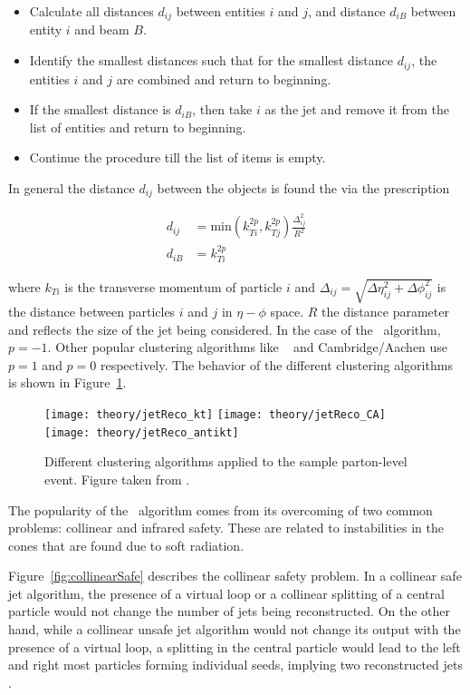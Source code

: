 \begin{itemize}
\item Calculate all distances $d_{ij}$ between entities $i$ and $j$, and distance $d_{iB}$ between entity $i$ and beam $B$.
\item Identify the smallest distances such that for the smallest distance $d_{ij}$, the entities $i$ and $j$ are combined and return to beginning.
\item If the smallest distance is $d_{iB}$, then take $i$ as the jet and remove it from the list of entities and return to beginning.
\item Continue the procedure till the list of items is empty.
\end{itemize}

In general the distance $d_{ij}$ between the objects is found the via the prescription

\begin{align}
d_{ij} &= \mathrm{min} (k_{Ti}^{2p} , k_{Tj}^{2p}) \frac{\Delta_{ij}^2}{R^2}  \\
d_{iB} &= k_{Ti}^{2p}
\end{align}

where $k_{Ti}$ is the transverse momentum of particle $i$ and $\Delta_{ij} = \sqrt{\Delta\eta_{ij}^2 + \Delta\phi_{ij}^2}$ is the distance between particles $i$ and $j$ in $\eta-\phi$ space.
$R$ the distance parameter and reflects the size of the jet being considered.
In the case of the \antikt\ algorithm, $p = -1$.
Other popular clustering algorithms like \kt\ \cite{Catani:1993hr} and Cambridge/Aachen \cite{Dokshitzer:1997in} use $p = 1$ and $p=0$ respectively.
The behavior of the different clustering algorithms is shown in Figure~\ref{fig:JetClustering}.


\begin{figure}[htp]
\centering
\texttt{[image: theory/jetReco\_kt]}\hfill
\texttt{[image: theory/jetReco\_CA]}\hfill
\texttt{[image: theory/jetReco\_antikt]}\hfill
\caption{Different clustering algorithms applied to the sample parton-level event.
Figure taken from \cite{Cacciari:2008gp}.}
\label{fig:JetClustering}
\end{figure}

The popularity of the \antikt\ algorithm comes from its overcoming of two common problems: collinear and infrared safety.
These are related to instabilities in the cones that are found due to soft radiation.


Figure~\ref{fig:collinearSafe} describes the collinear safety problem.
In a collinear safe jet algorithm, the presence of a virtual loop or a collinear splitting of a central particle would not change the number of jets being reconstructed.
On the other hand, while a collinear unsafe jet algorithm would not change its output with the presence of a virtual loop, a splitting in the central particle would lead to the left and right most particles forming individual seeds, implying two reconstructed jets \cite{Salam:2009jx}.

